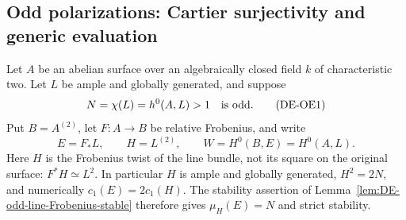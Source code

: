 \subsection{Odd polarizations: Cartier surjectivity and generic evaluation}

Let \(A\) be an abelian surface over an algebraically closed field
\(k\) of characteristic two. Let \(L\) be ample and globally
generated, and suppose
\[
 N=\chi(L)=h^0(A,L)>1\quad\hbox{is odd}.
 \tag{DE-OE1}
\]
Put \(B=A^{(2)}\), let \(F:A\to B\) be relative Frobenius,
and write
\[
 E=F_*L,\qquad H=L^{(2)},\qquad W=H^0(B,E)=H^0(A,L).
 \tag{DE-OE2}
\]
Here \(H\) is the Frobenius twist of the line bundle, not its
square on the original surface: \(F^*H\simeq L^2\).
In particular \(H\) is ample and globally generated,
\(H^2=2N\), and numerically \(c_1(E)=2c_1(H)\).
The stability assertion of Lemma~\ref{lem:DE-odd-line-Frobenius-stable}
therefore gives \(\mu_H(E)=N\) and strict stability.

